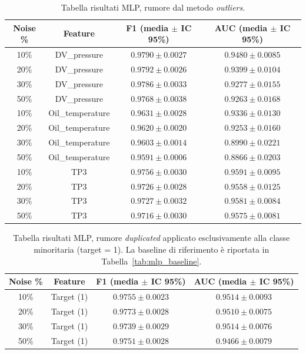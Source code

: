 \documentclass[../main.tex]{subfiles}
\begin{document}
\begin{table}[H]
\centering\small
{}
\begin{tabular}{cccc}
\toprule
\textbf{Noise \%} & \textbf{Feature} & \textbf{F1 (media $\pm$ IC 95\%)} & \textbf{AUC (media $\pm$ IC 95\%)} \\
\midrule
10\% & DV\_pressure     & $0.9790 \pm 0.0027$ & $0.9480 \pm 0.0085$ \\
20\% & DV\_pressure     & $0.9792 \pm 0.0026$ & $0.9399 \pm 0.0104$ \\
30\% & DV\_pressure     & $0.9786 \pm 0.0033$ & $0.9277 \pm 0.0155$ \\
50\% & DV\_pressure     & $0.9768 \pm 0.0038$ & $0.9263 \pm 0.0168$ \\
\midrule
10\% & Oil\_temperature & $0.9631 \pm 0.0028$ & $0.9336 \pm 0.0130$ \\
20\% & Oil\_temperature & $0.9620 \pm 0.0020$ & $0.9253 \pm 0.0160$ \\
30\% & Oil\_temperature & $0.9603 \pm 0.0014$ & $0.8990 \pm 0.0221$ \\
50\% & Oil\_temperature & $0.9591 \pm 0.0006$ & $0.8866 \pm 0.0203$ \\
\midrule
10\% & TP3             & $0.9756 \pm 0.0030$ & $0.9591 \pm 0.0095$ \\
20\% & TP3             & $0.9726 \pm 0.0028$ & $0.9558 \pm 0.0125$ \\
30\% & TP3             & $0.9727 \pm 0.0032$ & $0.9581 \pm 0.0084$ \\
50\% & TP3             & $0.9716 \pm 0.0030$ & $0.9575 \pm 0.0081$ \\
\bottomrule
\end{tabular}
\caption{Tabella risultati MLP, rumore dal metodo \textit{outliers}.}
\label{tab:mlp_outliers}
\end{table}

\begin{table}[H]
\centering\small
{}
\begin{tabular}{cccc}
\toprule
\textbf{Noise \%} & \textbf{Feature} & \textbf{F1 (media $\pm$ IC 95\%)} & \textbf{AUC (media $\pm$ IC 95\%)} \\
\midrule
10\% & Target (1) & $0.9755 \pm 0.0023$ & $0.9514 \pm 0.0093$ \\
20\% & Target (1) & $0.9773 \pm 0.0028$ & $0.9510 \pm 0.0075$ \\
30\% & Target (1) & $0.9739 \pm 0.0029$ & $0.9514 \pm 0.0076$ \\
50\% & Target (1) & $0.9751 \pm 0.0028$ & $0.9466 \pm 0.0079$ \\
\bottomrule
\end{tabular}
\caption{Tabella risultati MLP, rumore \textit{duplicated} applicato 
esclusivamente alla classe minoritaria (target = 1). 
La baseline di riferimento è riportata in Tabella~\ref{tab:mlp_baseline}.}
\label{tab:mlp_duplicated_minority}
\end{table}
\end{document}
